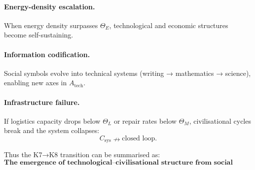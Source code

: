 \paragraph{Energy-density escalation.}
When energy density surpasses $\Theta_E$, technological and economic
structures become self-sustaining.

\paragraph{Information codification.}
Social symbols evolve into technical systems (writing → mathematics →
science), enabling new axes in $A_{\mathrm{tech}}$.

\paragraph{Infrastructure failure.}
If logistics capacity drops below $\Theta_L$ or repair rates below $\Theta_M$,
civilisational cycles break and the system collapses:
\[
C_{\mathrm{sys}} \nrightarrow \text{closed loop}.
\]

Thus the K7→K8 transition can be summarised as:
\[
\textbf{The emergence of technological–civilisational structure from social
norms, communication flows and institutional stability.}
\]
